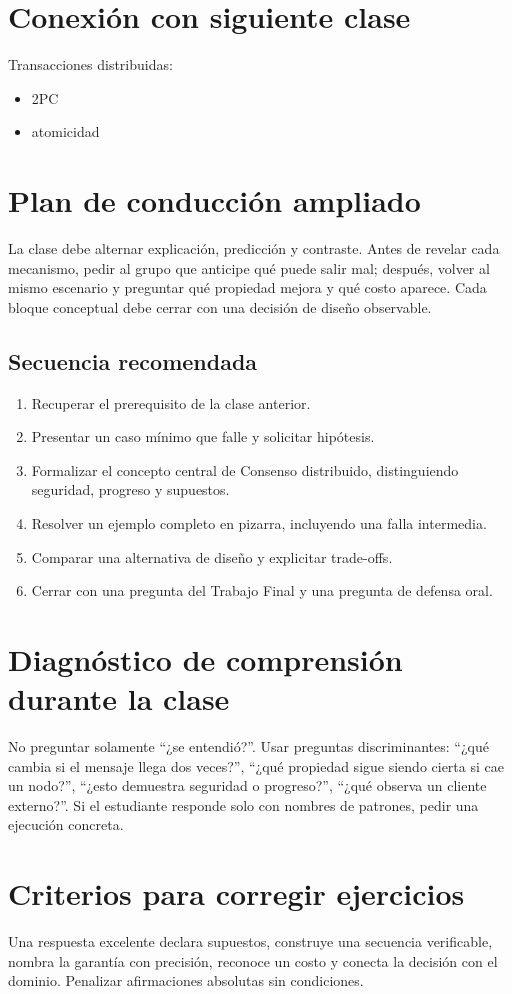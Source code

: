 \documentclass[variant=docente,cover=institutional,mode=screen]{ua-engineering-v6-article}
\begin{document}
\section{Conexión con siguiente clase}

Transacciones distribuidas:
\begin{itemize}
\item 2PC
\item atomicidad
\end{itemize}


\section{Plan de conducción ampliado}
La clase debe alternar explicación, predicción y contraste. Antes de revelar cada mecanismo, pedir al grupo que anticipe qué puede salir mal; después, volver al mismo escenario y preguntar qué propiedad mejora y qué costo aparece. Cada bloque conceptual debe cerrar con una decisión de diseño observable.
\subsection*{Secuencia recomendada}
\begin{enumerate}
\item Recuperar el prerequisito de la clase anterior.
\item Presentar un caso mínimo que falle y solicitar hipótesis.
\item Formalizar el concepto central de Consenso distribuido, distinguiendo seguridad, progreso y supuestos.
\item Resolver un ejemplo completo en pizarra, incluyendo una falla intermedia.
\item Comparar una alternativa de diseño y explicitar trade-offs.
\item Cerrar con una pregunta del Trabajo Final y una pregunta de defensa oral.
\end{enumerate}
\section{Diagnóstico de comprensión durante la clase}
No preguntar solamente ``¿se entendió?''. Usar preguntas discriminantes: ``¿qué cambia si el mensaje llega dos veces?'', ``¿qué propiedad sigue siendo cierta si cae un nodo?'', ``¿esto demuestra seguridad o progreso?'', ``¿qué observa un cliente externo?''. Si el estudiante responde solo con nombres de patrones, pedir una ejecución concreta.
\section{Criterios para corregir ejercicios}
Una respuesta excelente declara supuestos, construye una secuencia verificable, nombra la garantía con precisión, reconoce un costo y conecta la decisión con el dominio. Penalizar afirmaciones absolutas sin condiciones.
\end{document}
